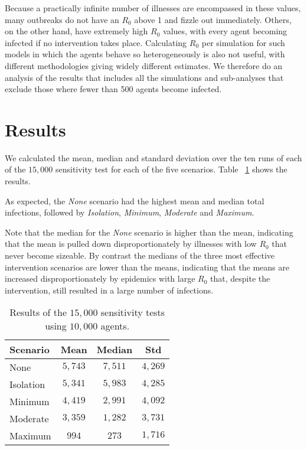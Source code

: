 \documentclass{article}
\begin{document}
Because a practically infinite number of illnesses are encompassed in these
values, many outbreaks do not have an $R_0$ above 1 and fizzle out
immediately. Others, on the other hand, have extremely high $R_0$ values, with
every agent becoming infected if no intervention takes place. Calculating $R_0$
per simulation for such models in which the agents behave so heterogeneously is
also not useful, with different methodologies giving widely different
estimates. We therefore do an analysis of the results that includes all the
simulations and sub-analyses that exclude those where fewer than 500 agents
become infected.

\section{Results}\label{results}

We calculated the mean, median and standard deviation over the ten runs of each
of the $15,000$ sensitivity test for each of the five scenarios. Table
~\ref{table:results_10k} shows the results.

As expected, the \emph{None} scenario had the highest mean and median total
infections, followed by \emph{Isolation}, \emph{Minimum}, \emph{Moderate} and
\emph{Maximum}.

Note that the median for the \emph{None} scenario is higher than the mean,
indicating that the mean is pulled down disproportionately by illnesses with
low $R_0$ that never become sizeable. By contrast the medians of the three most
effective intervention scenarios are lower than the means, indicating that the
means are increased disproportionately by epidemics with large $R_0$ that,
despite the intervention, still resulted in a large number of infections.

\begin{table}[h!]
  \centering
  \begin{tabular}{|l|c|c|c|}
    \hline
    Scenario & Mean & Median & Std\\ \hline
    None & $5,743$ & $7,511$ & $4,269$\\ \hline
    Isolation & $5,341$ & $5,983$ & $4,285$\\ \hline
    Minimum & $4,419$ & $2,991$ & $4,092$ \\ \hline
    Moderate & $3,359$ & $1,282$ & $3,731$ \\ \hline
    Maximum & $994$ & $273$ & $1,716$\\ \hline
  \end{tabular}
  \caption{Results of the $15,000$ sensitivity tests using $10,000$ agents.}
  \label{table:results_10k}
\end{table}
\end{document}
